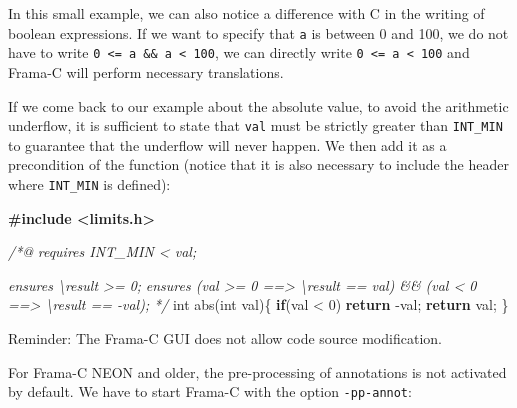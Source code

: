 \documentclass[12pt,francais,]{scrbook}
\newenvironment{Shaded}{}{}
\newcommand{\KeywordTok}[1]{\textcolor[rgb]{0.00,0.44,0.13}{\textbf{{#1}}}}
\newcommand{\DataTypeTok}[1]{\textcolor[rgb]{0.56,0.13,0.00}{{#1}}}
\newcommand{\DecValTok}[1]{\textcolor[rgb]{0.25,0.63,0.44}{{#1}}}
\newcommand{\CommentTok}[1]{\textcolor[rgb]{0.38,0.63,0.69}{\textit{{#1}}}}
\newcommand{\ErrorTok}[1]{\textcolor[rgb]{1.00,0.00,0.00}{\textbf{{#1}}}}
\newcommand{\NormalTok}[1]{{#1}}
\newenvironment{zdsalertblock}[1]{%
  \tcolorbox[beamer,%
    noparskip,breakable,
    colback=LightCoral,colframe=DarkRed,%
    colbacklower=Tomato,%
    title=#1]
}{\endtcolorbox}
\newenvironment{zdsblock}[1]{%
  \tcolorbox[beamer,%
    noparskip,breakable,
    colback=LightBlue,colframe=DarkBlue,%
    colbacklower=DarkBlue,%
    title=#1]
}{\endtcolorbox}
\begin{document}
In this small example, we can also notice a difference with C in the
writing of boolean expressions. If we want to specify that \texttt{a} is
between 0 and 100, we do not have to write
\texttt{0\ \textless{}=\ a\ \&\&\ a\ \textless{}\ 100}, we can directly
write \texttt{0\ \textless{}=\ a\ \textless{}\ 100} and Frama-C will
perform necessary translations.

If we come back to our example about the absolute value, to avoid the
arithmetic underflow, it is sufficient to state that \texttt{val} must
be strictly greater than \texttt{INT\_MIN} to guarantee that the
underflow will never happen. We then add it as a precondition of the
function (notice that it is also necessary to include the header where
\texttt{INT\_MIN} is defined):

\begin{footnotesize}\begin{Shaded}
\begin{Highlighting}[]
\ErrorTok{#include <limits.h>}

\CommentTok{/*@}
\CommentTok{  requires INT_MIN < val;}

\CommentTok{  ensures \textbackslash{}result >= 0;}
\CommentTok{  ensures (val >= 0 ==> \textbackslash{}result == val) && }
\CommentTok{          (val < 0 ==> \textbackslash{}result == -val);}
\CommentTok{*/}
\DataTypeTok{int} \NormalTok{abs(}\DataTypeTok{int} \NormalTok{val)\{}
  \KeywordTok{if}\NormalTok{(val < }\DecValTok{0}\NormalTok{) }\KeywordTok{return} \NormalTok{-val;}
  \KeywordTok{return} \NormalTok{val;}
\NormalTok{\}}
\end{Highlighting}
\end{Shaded}\end{footnotesize}

\begin{zdsalertblock}{Warning}
  Reminder: The Frama-C GUI does not allow code source modification.
\end{zdsalertblock}
  
\begin{zdsblock}{Information}
For Frama-C NEON and older, the
pre-processing of annotations is not activated by default. We
have to start Frama-C with the option \texttt{-pp-annot}:

  \begin{footnotesize}\begin{Shaded}
  \end{Shaded}\end{footnotesize}
\end{zdsblock}
\end{document}
